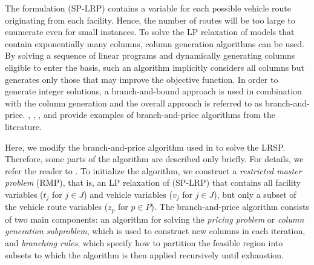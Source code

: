 \documentclass[graybox]{./styles/svmult}
\begin{document}
The formulation (SP-LRP) contains a variable for each possible vehicle
route originating from each facility. Hence, the number of routes will
be too large to enumerate even for small instances. To solve the LP
relaxation of models that contain exponentially many columns, column
generation algorithms can be used. By solving a sequence of linear
programs and dynamically generating columns eligible to enter the
basis, such an algorithm implicitly considers all columns but generates
only those that may improve the objective function. In order to
generate integer solutions, a branch-and-bound approach is used in
combination with the column generation and the overall approach is
referred to as branch-and-price. \citet{Desrochers2}, \citet{Vance2},
\citet{Berger07}, and \citet{Akca} provide examples of
branch-and-price algorithms from the literature.

Here, we modify the branch-and-price algorithm used in \citet{Akca} to
solve the LRSP. Therefore, some parts of the algorithm are described
only briefly. For details, we refer the reader to \citet{Akca}. To
initialize the algorithm, we construct a \emph{restricted master
problem} (RMP), that is, an LP relaxation of (SP-LRP) that contains
all facility variables ($t_j$ for $j \in J$) and vehicle variables
($v_j$ for $j \in J$), but only a subset of the vehicle route
variables ($z_p$ for $p \in P$). The branch-and-price
algorithm consists of two main components: an algorithm for
solving the \emph{pricing problem} or \emph{column generation
subproblem}, which is used to construct new columns in each iteration,
and \emph{branching rules}, which specify how to partition the
feasible region into subsets to which the algorithm is then applied
recursively until exhaustion.
\end{document}
